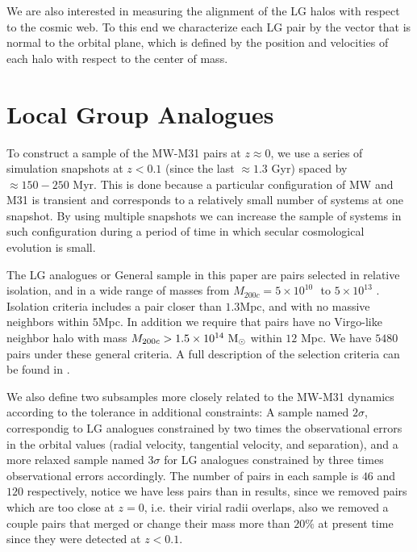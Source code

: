 \documentclass{emulateapj}
\newcommand{\mpc}{\rm{Mpc}}
\newcommand{\msun}{{\ifmmode{{\rm {M_{\odot}}}}\else{${\rm{M_{\odot}}}$}\fi}}
\begin{document}
We are also interested in measuring the alignment of the LG halos with
respect to the cosmic web. To this end we characterize each LG pair by
the vector that is normal to the orbital plane, which is defined by
the position and velocities of each halo with respect to the center of
mass. 


\section{Local Group Analogues}
\label{sec:lg_analogues}

To construct a sample of the MW-M31 pairs at $z\approx 0$, we use a
series of simulation snapshots  at $z<0.1$ (since the last $\approx
1.3$ Gyr) spaced by $\approx 150-250$ Myr. This is done
because a particular configuration of MW and M31 is transient and
corresponds to a relatively small number of systems at one
snapshot. By using multiple snapshots we can increase the sample of
systems in such configuration during a period of time in which secular
cosmological evolution is small. 

The LG analogues or General sample in this paper are pairs selected in relative isolation,
and in a wide range of masses from  $M_{200c}=5 \times 10^{10}$ \msun $ $ to $ 5 \times 10^{13}$ \msun. 
Isolation criteria includes a pair closer than $1.3$\mpc, and with no massive neighbors within $5$\mpc.
In addition we require that pairs have no Virgo-like neighbor halo with mass $M_{200c}>1.5 \times 10^{14}\ \rm M_{\odot}$ within $12$ Mpc. 
We have $5480$ pairs under these general criteria.
A full description of the selection criteria can be found in \citet{lganalogues,sat}. 

We also define two subsamples more closely related to the MW-M31 
dynamics  according to the tolerance in additional constraints:
A sample named $2\sigma$, correspondig to LG analogues constrained by
two times the observational errors in the orbital values (radial
velocity, tangential velocity, and separation), and a more relaxed
sample named $3\sigma$ for LG analogues constrained by three times
observational errors accordingly. The number of pairs in each sample
is $46$ and $120$ respectively, notice we have less pairs than in
\citet{lganalogues} results, since we removed pairs which are too
close at $z=0$, i.e. their virial radii overlaps, also we removed a
couple pairs that merged or change their mass more than $20\%$ at
present time since they were detected at $z<0.1$.  

\end{document}
